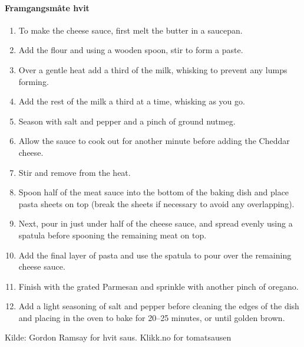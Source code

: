 	\paragraph{Framgangsmåte hvit}
	\begin{enumerate}[noitemsep]
	\item To make the cheese sauce, first melt the butter in a saucepan.
	\item Add the flour and using a wooden spoon, stir to form a paste.
	\item Over a gentle heat add a third of the milk, whisking to prevent any lumps forming.
	\item Add the rest of the milk a third at a time, whisking as you go.
	\item Season with salt and pepper and a pinch of ground nutmeg.
	\item Allow the sauce to cook out for another minute before adding the Cheddar cheese.
	\item Stir and remove from the heat.
	\item Spoon half of the meat sauce into the bottom of the baking dish and place pasta sheets on top (break the sheets if necessary to avoid any overlapping).
	\item Next, pour in just under half of the cheese sauce, and spread evenly using a spatula before spooning the remaining meat on top.
	\item Add the final layer of pasta and use the spatula to pour over the remaining cheese sauce.
	\item Finish with the grated Parmesan and sprinkle with another pinch of oregano.
	\item Add a light seasoning of salt and pepper before cleaning the edges of the dish and placing in the oven to bake for 20--25 minutes, or until golden brown.
\end{enumerate}


Kilde: Gordon Ramsay for hvit saus. Klikk.no for tomatsausen
